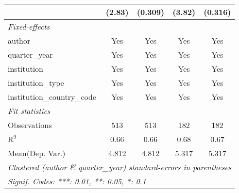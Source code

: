 \begin{tabular}{lcccc}
                                            & (2.83)      & (0.309) & (3.82)       & (0.316)\\   
   \midrule
   \emph{Fixed-effects}\\
   author                                   & Yes         & Yes     & Yes          & Yes\\  
   quarter\_year                            & Yes         & Yes     & Yes          & Yes\\  
   institution                              & Yes         & Yes     & Yes          & Yes\\  
   institution\_type                        & Yes         & Yes     & Yes          & Yes\\  
   institution\_country\_code               & Yes         & Yes     & Yes          & Yes\\  
   \midrule
   \emph{Fit statistics}\\
   Observations                             & 513         & 513     & 182          & 182\\  
   R$^2$                                    & 0.66        & 0.66    & 0.68         & 0.67\\  
Mean(Dep. Var.) & 4.812 & 4.812 & 5.317 & 5.317 \\
   \midrule \midrule
   \multicolumn{5}{l}{\emph{Clustered (author \& quarter\_year) standard-errors in parentheses}}\\
   \multicolumn{5}{l}{\emph{Signif. Codes: ***: 0.01, **: 0.05, *: 0.1}}\\
\end{tabular}
\par\endgroup

